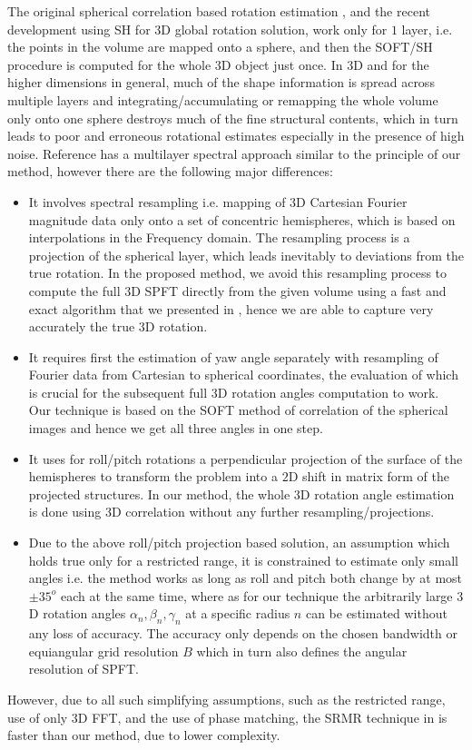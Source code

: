 \documentclass{UCF_ETD}
\begin{document}
The original spherical correlation based rotation estimation \cite{Kostelec2008}, and the recent development using SH \cite{Salah2013} for $3$D global rotation solution, work only for $1$ layer, i.e. the points in the volume are mapped onto a sphere, and then the SOFT/SH procedure is computed for the whole $3$D object just once. 
In $3$D and for the higher dimensions in general, much of the shape information is spread across multiple layers and integrating/accumulating or remapping the whole volume only onto one sphere destroys much of the fine structural contents, which in turn leads to poor and erroneous rotational estimates especially in the presence of high noise. Reference \cite{Bulow2013} has a multilayer spectral approach similar to the principle of our method, however there are the following major differences:
\begin{itemize}
\item It involves spectral resampling i.e. mapping of $3$D Cartesian Fourier magnitude data only onto a set of concentric hemispheres, which is based on interpolations in the Frequency domain. The resampling process is a projection of the spherical layer, which leads inevitably to deviations from the true rotation. In the proposed method, we avoid this resampling process to compute the full $3$D SPFT directly from the given volume using a fast and exact algorithm that we presented in \cite{Alam2015}, hence we are able to capture very accurately the true $3$D rotation.
\item It requires first the estimation of yaw angle separately with resampling of Fourier data from Cartesian to spherical coordinates, the evaluation of which is crucial for the subsequent full $3$D rotation angles computation to work. Our technique is based on the SOFT method of correlation of the spherical images and hence we get all three angles in one step. 
\item It uses for roll/pitch rotations a perpendicular projection of the surface of the hemispheres to transform the problem into a $2$D shift in matrix form of the projected structures. In our method, the whole $3$D rotation angle estimation is done using $3$D correlation without any further resampling/projections.  
\item Due to the above roll/pitch projection based solution, an assumption which holds true only for a restricted range, it is constrained to estimate only small angles i.e. the method works as long as roll and pitch both change by at most $\pm 35^o$ each at the same time, where as for our technique the arbitrarily large $3$D rotation angles $\alpha_n,\beta_n,\gamma_n$ at a specific radius $n$ can be estimated without any loss of accuracy. The accuracy only depends on the chosen bandwidth or equiangular grid resolution $B$ which in turn also defines the angular resolution of SPFT.
\end{itemize}
However, due to all such simplifying assumptions, such as the restricted range, use of only $3$D FFT, and the use of phase matching, the SRMR technique in \cite{Bulow2013} is faster than our method, due to lower complexity.
\end{document}
